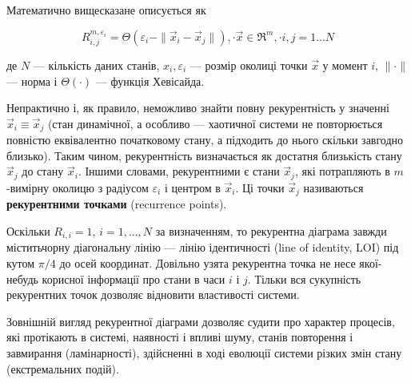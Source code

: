 \documentclass[
  letterpaper,
]{report}
\begin{document}
Математично вищесказане описується як

\[
R_{i,j}^{m,\varepsilon_i}=\Theta(\varepsilon_i-\| \vec x_i - \vec x_j \|), \cdot \vec x \in \Re^m, \cdot i, j=1...N
\]

де \(N\) --- кількість даних станів, \(x_i, \varepsilon_i\) --- розмір
околиці точки \(\vec x\) у момент \(i\), \(\| \cdot \|\) --- норма і
\(\Theta(\cdot)\) --- функція Хевісайда.

Непрактично і, як правило, неможливо знайти повну рекурентність у
значенні \(\vec x_i \equiv \vec x_j\) (стан динамічної, а особливо ---
хаотичної системи не повторюється повністю еквівалентно початковому
стану, а підходить до нього скільки завгодно близько). Таким чином,
рекурентність визначається як достатня близькість стану \(\vec x_j\) до
стану \(\vec x_i\). Іншими словами, рекурентними є стани \(\vec x_j\),
які потрапляють в \(m\)-вимірну околицю з радіусом \(\varepsilon_i\) і
центром в \(\vec x_i\). Ці точки \(\vec x_j\) називаються
\textbf{рекурентними точками} (recurrence points).

Оскільки \(R_{i,i}=1\), \(i=1,...,N\) за визначенням, то рекурентна
діаграма завжди міститьчорну діагональну лінію --- лінію ідентичності
(line of identity, LOI) під кутом \(\pi/4\) до осей координат. Довільно
узята рекурентна точка не несе якої-небудь корисної інформації про стани
в часи \(i\) і \(j\). Тільки вся сукупність рекурентних точок дозволяє
відновити властивості системи.

Зовнішній вигляд рекурентної діаграми дозволяє судити про характер
процесів, які протікають в системі, наявності і впливі шуму, станів
повторення і завмирання (ламінарності), здійсненні в ході еволюції
системи різких змін стану (екстремальних подій).
\end{document}
